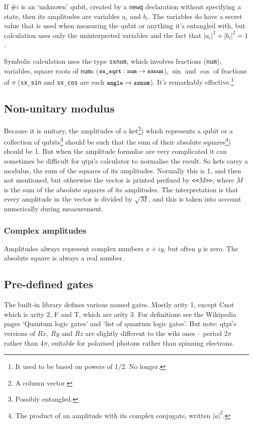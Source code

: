 \documentclass[11pt,a4paper]{article}
\newcommand{\verbtt}[1]{\texttt{\small{}#1}}
\begin{document}
If $\#i${} is an `unknown' qubit, created by a \verbtt{newq} declaration without specifying a state, then its amplitudes are variables $a_{i}$ and $b_{i}$. The variables do have a secret value that is used when measuring the qubit or anything it's entangled with, but calculation uses only the uninterpreted variables and the fact that $|a_{i}|^{2}+|b_{i}|^{2}=1$.

Symbolic calculation uses the type \verbtt{sxnum}, which involves fractions (\verbtt{num}), variables, square roots of \verbtt{num}s ($\verbtt{sx\_sqrt}: \verbtt{num}->\verbtt{sxnum}$), $\sin$ and $\cos$ of fractions of $\pi$ (\verbtt{sx\_sin} and \verbtt{sx\_cos} are each $\verbtt{angle}->\verbtt{sxnum}$). It's remarkably effective.\footnote{It used to be based on powers of 1/2. No longer.}

\subsection{Non-unitary modulus}

Because it is unitary, the amplitudes of a ket\footnote{A column vector.}) which represents a qubit or a collection of qubits\footnote{Possibly entangled.} should be such that the sum of their absolute squares\footnote{The product of an amplitude with its complex conjugate, written $|a|^{2}$.}) should be 1. But when the amplitude formulae are very complicated it can sometimes be difficult for qtpi's calculator to normalise the result. So kets carry a modulus, the sum of the squares of its amplitudes. Normally this is 1, and then not mentioned, but otherwise the vector is printed prefixed by \verbtt{<<}$M$\verbtt{>>}, where $M$ is the sum of the absolute squares of its amplitudes. The interpretation is that every amplitude in the vector is divided by $\sqrt{M}$, and this is taken into account numerically during measurement.

\subsubsection{Complex amplitudes}

Amplitudes always represent complex numbers $x+iy$, but often $y$ is zero. The absolute square is always a real number.

\subsection{Pre-defined gates}

The built-in library defines various named gates. Mostly arity 1, except Cnot which is arity 2, F and T, which are arity 3. For definitions see the Wikipedia pages `Quantum logic gates' and `list of quantum logic gates'. But note: qtpi's versions of $Rx$, $Ry$ and $Rz$ are slightly different to the wiki ones -- period $2\pi$ rather than $4\pi$, suitable for polarised photons rather than spinning electrons. 
\end{document}
